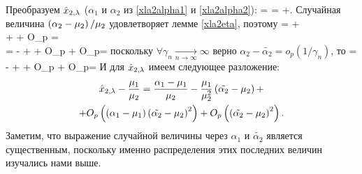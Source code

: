 \documentclass[a4paper,14pt,russian]{article}
\begin{document}
Преобразуем $\hat{x}_{2,\lambda}$ ($\alpha_1$ и $\alpha_2$ из \eqref{xla2alpha1} и \eqref{xla2alpha2}):
\ml
{
 =  = \times{}+\times {}.
}
Случайная величина $\left(\alpha_2 -\mu_2 \right)/\mu_2$ удовлетворяет лемме \ref{xla2eta}, поэтому
\ml
{
  =  + \\+  + O_p =\\=
 -   +  + O_p + O_p=
}
поскольку $\forall \gamma_n \xrightarrow[n \to \infty]{} \infty$ верно $\alpha_2-\tilde{\alpha_2} = o_p(1/\gamma_n)$, то
\ml
{
= -   +  + O_p + O_p=
}
И для $\hat{x}_{2,\lambda}$ имеем следующее разложение:
\begin{multline}
 \hat{x}_{2,\lambda} -  \frac{\mu_1}{\mu_2} = \frac{\alpha_1 - \mu_1}{\mu_2}  -
    \frac{\mu_1}{\mu_2 ^2} \left(\tilde{\alpha_2}-\mu_2\right) + \\ +O_p\left(\left(\alpha_1 - \mu_1\right)\left(\tilde{\alpha_2}-\mu_2\right)^2\right) + O_p\left(\left(\tilde{\alpha_2}-\mu_2\right)^2\right).
    \label{xlar}
\end{multline}
Заметим, что выражение случайной величины через $\alpha_1 \text{ и }\tilde{\alpha_2}$ является существенным, поскольку именно распределения этих последних величин изучались нами выше.
\end{document}
